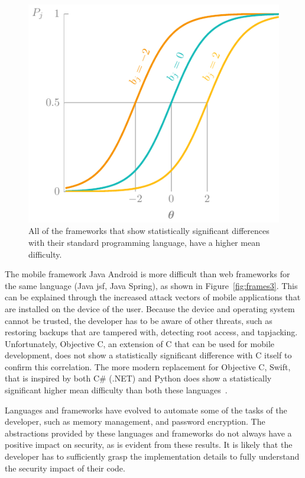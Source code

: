 \begin{figure}
    \centering
    \includegraphics[page=10]{03-education/figures/tikzfigures.pdf}
    \caption[Frameworks versus default languages]{All of the frameworks that show statistically significant differences with their standard programming language, have a higher mean difficulty.}
    \label{fig:frames2}
\end{figure}

The mobile framework Java Android is more difficult than web frameworks for the same language (Java \gls{jsf}, Java Spring), as shown in Figure~\ref{fig:frames3}.
This can be explained through the increased attack vectors of mobile applications that are installed on the device of the user.
Because the device and operating system cannot be trusted, the developer has to be aware of other threats, such as restoring backups that are tampered with, detecting root access, and tapjacking.
Unfortunately, Objective C, an extension of C that can be used for mobile development, does not show a statistically significant difference with C itself to confirm this correlation.
The more modern replacement for Objective C, Swift, that is inspired by both C\# (.NET) and Python does show a statistically significant higher mean difficulty than both these languages~\cite{nondot}.

Languages and frameworks have evolved to automate some of the tasks of the developer, such as memory management, and password encryption.
The abstractions provided by these languages and frameworks do not always have a positive impact on security, as is evident from these results.
It is likely that the developer has to sufficiently grasp the implementation details to fully understand the security impact of their code.

